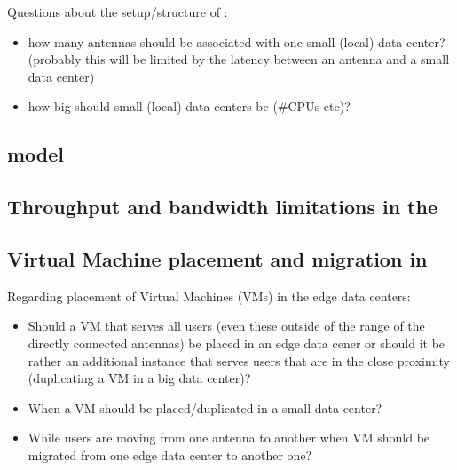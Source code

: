 Questions about the setup/structure of \xcloud:
\begin{itemize}
\item how many antennas should be associated with one small (local) data center? (probably this will be limited by the latency between an antenna and a small data center)
\item how big should small (local) data centers be (\#CPUs etc)?
\end{itemize}

\subsection{\xcloud model}

\subsection{Throughput and bandwidth limitations in the \xcloud}

\subsection{Virtual Machine placement and migration in \xcloud}

Regarding placement of Virtual Machines (VMs) in the edge data centers:
\begin{itemize}
\item Should a VM that serves all users (even these outside of the range of the directly connected antennas) be placed in an edge data cener or should it be rather an additional instance that serves users that are in the close proximity (duplicating a VM in a big data center)?
\item When a VM should be placed/duplicated in a small data center?
\item While users are moving from one antenna to another when VM should be migrated from one edge data center to another one?
\end{itemize}